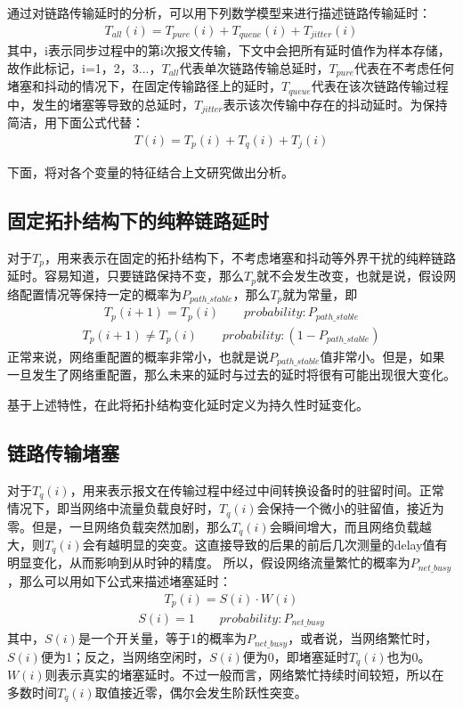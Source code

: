 通过对链路传输延时的分析，可以用下列数学模型来进行描述链路传输延时：
\begin {align}
T_{all}(i) = T_{pure}(i) + T_{queue}(i) + T_{jitter}(i)
\end{align}
其中，i表示同步过程中的第i次报文传输，下文中会把所有延时值作为样本存储，故作此标记，i=1，2，3...，$T_{all}$代表单次链路传输总延时，$T_{pure}$代表在不考虑任何堵塞和抖动的情况下，在固定传输路径上的延时，$T_{queue}$代表在该次链路传输过程中，发生的堵塞等导致的总延时，$T_{jitter}$表示该次传输中存在的抖动延时。为保持简洁，用下面公式代替：
\begin {align}
T(i) = T_{p}(i) + T_{q}(i) + T_{j}(i)
\end{align}

下面，将对各个变量的特征结合上文研究做出分析。

\subsection{固定拓扑结构下的纯粹链路延时}
对于$T_{p}$，用来表示在固定的拓扑结构下，不考虑堵塞和抖动等外界干扰的纯粹链路延时。容易知道，只要链路保持不变，那么$T_{p}$就不会发生改变，也就是说，假设网络配置情况等保持一定的概率为$P_{path\_stable}$，那么$T_{p}$就为常量，即
\begin {align}
T_{p}(i+1) = T_{p}(i) \qquad probability: P_{path\_stable}
\end{align}
\begin {align}
T_{p}(i+1) \neq T_{p}(i) \qquad probability: (1-P_{path\_stable})
\end{align}
正常来说，网络重配置的概率非常小，也就是说$P_{path\_stable}$值非常小。但是，如果一旦发生了网络重配置，那么未来的延时与过去的延时将很有可能出现很大变化。

基于上述特性，在此将拓扑结构变化延时定义为持久性时延变化。

\subsection{链路传输堵塞}
对于$T_{q}(i)$，用来表示报文在传输过程中经过中间转换设备时的驻留时间。正常情况下，即当网络中流量负载良好时，$T_{q}(i)$会保持一个微小的驻留值，接近为零。但是，一旦网络负载突然加剧，那么$T_{q}(i)$会瞬间增大，而且网络负载越大，则$T_{q}(i)$会有越明显的突变。这直接导致的后果的前后几次测量的delay值有明显变化，从而影响到从时钟的精度。
所以，假设网络流量繁忙的概率为$P_{net\_busy}$，那么可以用如下公式来描述堵塞延时：
\begin {align}
T_{p}(i) = S(i) \cdot W(i) 
\end{align}
\begin {align}
S(i) = 1 \qquad probability: P_{net\_busy}
\end{align}
其中，$S(i)$是一个开关量，等于1的概率为$P_{net\_busy}$，或者说，当网络繁忙时，$S(i)$便为1；反之，当网络空闲时，$S(i)$便为0，即堵塞延时$T_{q}(i)$也为0。$W(i)$则表示真实的堵塞延时。不过一般而言，网络繁忙持续时间较短，所以在多数时间$T_{q}(i)$取值接近零，偶尔会发生阶跃性突变。

